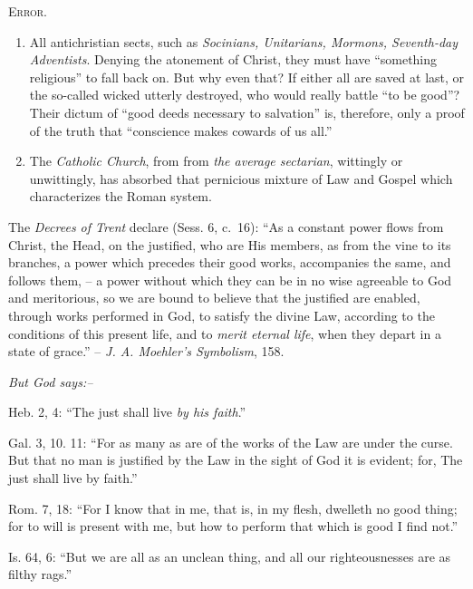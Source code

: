 \documentclass[
]{book}
\begin{document}
\begin{center}
\textsc{Error.}
\end{center}

\begin{enumerate}
\def\labelenumi{\arabic{enumi}.}
\item
  All antichristian sects, such as \emph{Socinians, Unitarians, Mormons, Seventh-day Adventists}. Denying the atonement of Christ, they must have ``something religious'' to fall back on. But why even that? If either all are saved at last, or the so-called wicked utterly destroyed, who would really battle ``to be good''? Their dictum of ``good deeds necessary to salvation'' is, therefore, only a proof of the truth that ``conscience makes cowards of us all.''
\item
  The \emph{Catholic Church}, from from \emph{the average sectarian}, wittingly or unwittingly, has absorbed that pernicious mixture of Law and Gospel which characterizes the Roman system.
\end{enumerate}

The \emph{Decrees of Trent} declare (Sess. 6, c.~16): ``As a constant power flows from Christ, the Head, on the justified, who are His members, as from the vine to its branches, a power which precedes their good works, accompanies the same, and follows them, -- a power without which they can be in no wise agreeable to God and meritorious, so we are bound to believe that the justified are enabled, through works performed in God, to satisfy the divine Law, according to the conditions of this present life, and to \emph{merit eternal life}, when they depart in a state of grace.'' -- \emph{J. A. Moehler's Symbolism}, 158.

\begin{center}
\textsl{But God says:--}
\end{center}

Heb. 2, 4: ``The just shall live \emph{by his faith}.''

Gal. 3, 10. 11: ``For as many as are of the works of the Law are under the curse. But that no man is justified by the Law in the sight of God it is evident; for, The just shall live by faith.''

Rom. 7, 18: ``For I know that in me, that is, in my flesh, dwelleth no good thing; for to will is present with me, but how to perform that which is good I find not.''

Is. 64, 6: ``But we are all as an unclean thing, and all our righteousnesses are as filthy rags.''
\end{document}
